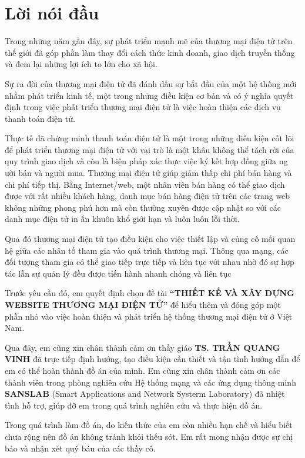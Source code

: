 \thispagestyle{plain}
\chapter*{Lời nói đầu}
Trong những năm gần đây, sự phát triển mạnh mẽ của thương mại điện tử trên thế giới đã góp phần làm thay đổi cách thức kinh doanh, giao dịch truyền thống và đem lại những lợi ích to lớn cho xã hội.
\par
Sự ra đời của thương mại điện tử đã đánh dấu sự bắt đầu của một hệ thống mới nhằm phát triển kinh tế, một trong những điều kiện cơ bản và có ý nghĩa quyết định trong việc phát triển thương mại điện tử là việc hoàn thiện các dịch vụ thanh toán điện tử.
\par 
Thực tế đã chứng minh thanh toán điện tử là một trong những điều kiện cốt lõi để phát triển thương mại điện tử với vai trò là một khâu không thể tách rời của quy trình giao dịch và còn là biện pháp xác thực việc ký kết hợp đồng giữa ng ười bán và
người mua. Thương mại điện tử giúp giảm thấp chi phí bán hàng và chi phí tiếp thị. Bằng Internet/web, một nhân viên bán hàng có thể giao dịch được với rất nhiều khách hàng, danh mục bán hàng điện tử trên các trang web không những phong phú hơn mà còn thường xuyên được cập nhật so với các danh mục điện tử in ấn khuôn khổ giới hạn và luôn luôn lỗi thời.
\par
Qua đó thương mại điện tử tạo điều kiện cho việc thiết lập và củng cố mối quan hệ giữa các nhân tố tham gia vào quá trình thương mại. Thông qua mạng, các đối tượng tham gia có thể giao tiếp trực tiếp và liên tục với nhau nhờ đó sự hợp tác lẫn sự
quản lý đều được tiến hành nhanh chóng và liên tục
\par 
Trước yêu cầu đó, em quyết định chọn đề tài \textbf{“THIẾT KẾ VÀ XÂY DỰNG WEBSITE THƯƠNG MẠI ĐIỆN TỬ”} để hiểu thêm và đóng góp một phần nhỏ vào việc hoàn thiện và phát triển hệ thống thương mại điện tử ở Việt Nam.
\par
Qua đây, em cũng xin chân thành cảm ơn thầy giáo \textbf{TS. TRẦN QUANG VINH} đã trực tiếp định hướng, tạo điều kiện cần thiết và tận tình hướng dẫn để em có thể hoàn thành đồ án của mình. Em cũng xin chân thành cảm ơn các thành viên trong phòng nghiên cứu Hệ thống mạng và các ứng dụng thông minh \textbf{SANSLAB} (Smart Applications and Network Systerm Laboratory) đã nhiệt tình hỗ trợ, giúp đỡ em trong quá trình nghiên cứu và thực hiện đồ án.
\par
Trong quá trình làm đồ án, do kiến thức của em còn nhiều hạn chế và hiểu biết chưa rộng nên đồ án không tránh khỏi thếu sót. Em rất mong nhận được sự chị bảo và nhận xét quý báu của các thầy cô.
